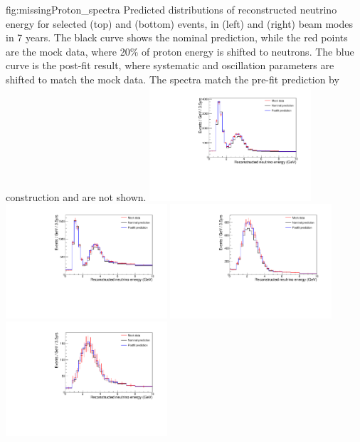 \begin{dunefigure}{fig:missingProton_spectra}
{Predicted distributions of reconstructed neutrino energy for selected \numu (top) and \nue (bottom) events, in  (left) and  (right) beam modes in 7 years. The black curve shows the nominal  prediction, while the red points are the mock data, where 20\% of proton energy is shifted to neutrons. The blue curve is the post-fit result, where systematic and oscillation parameters are shifted to match the mock data. The  spectra match the pre-fit prediction by construction and are not shown.}
  \includegraphics[width=0.45\textwidth]{graphics/missingProtonEnergyNDconstraint_NUMU_FHC_TDR.pdf}
  \includegraphics[width=0.45\textwidth]{graphics/missingProtonEnergyNDconstraint_NUMU_RHC_TDR.pdf}
  \includegraphics[width=0.45\textwidth]{graphics/missingProtonEnergyNDconstraint_NUE_FHC_TDR.pdf}
  \includegraphics[width=0.45\textwidth]{graphics/missingProtonEnergyNDconstraint_NUE_RHC_TDR.pdf}
\end{dunefigure}

